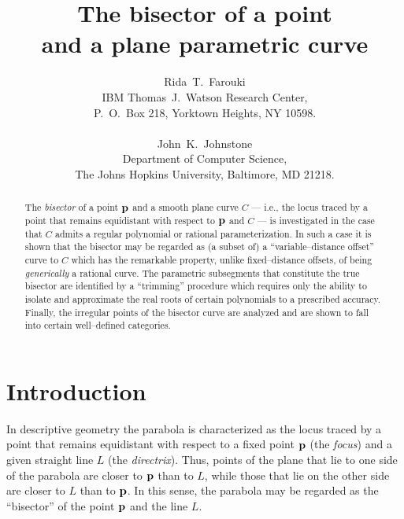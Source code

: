 
\title{
The bisector of a point \\
and a plane parametric curve
}

\author{
Rida~T.~Farouki \\
IBM Thomas~J.~Watson Research Center, \\
P.~O.~Box 218, Yorktown Heights, NY 10598. \\ \\
John~K.~Johnstone \\
Department of Computer Science, \\
The Johns Hopkins University, Baltimore, MD 21218.
}

\maketitle

\begin{abstract}
The {\it bisector\/} of a point ${\bf p}$ and a smooth plane curve
$C$ --- i.e., the locus traced by a point that remains equidistant
with respect to ${\bf p}$ and $C$ --- is investigated in the case
that $C$ admits a regular polynomial or rational parameterization.
In such a case it is shown that the bisector may be regarded as (a
subset of) a ``variable--distance offset'' curve to $C$ which has
the remarkable property, unlike fixed--distance offsets, of being
{\it generically\/} a rational curve. The parametric subsegments
that constitute the true bisector are identified by a ``trimming''
procedure which requires only the ability to isolate and approximate
the real roots of certain polynomials to a prescribed accuracy.
Finally, the irregular points of the bisector curve are analyzed
and are shown to fall into certain well--defined categories.
\end{abstract}

\newpage\thispagestyle{empty}\mbox{}\vfill\eject

\setcounter{page}{1}
\thispagestyle{plain}

\section{Introduction}
\label{intro}

In descriptive geometry \cite{coxeter69} the parabola is
characterized as the locus traced by a point that remains
equidistant with respect to a fixed point ${\bf p}$ (the
{\it focus\/}) and a given straight line $L$ (the {\it
directrix\/}). Thus, points of the plane that lie to one
side of the parabola are closer to ${\bf p}$ than to $L$,
while those that lie on the other side are closer to $L$
than to ${\bf p}$. In this sense, the parabola may be
regarded as the ``bisector'' of the point ${\bf p}$ and
the line $L$.

